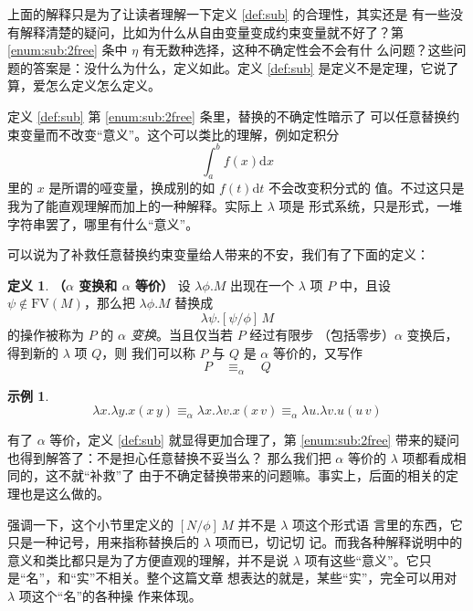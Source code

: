 \documentclass[a4paper,adobefonts]{ctexart}
\theoremstyle{definition}
\newtheorem{definition}{定义}
\newtheorem{example}{示例}
\begin{document}
上面的解释只是为了让读者理解一下定义 \ref{def:sub} 的合理性，其实还是
有一些没有解释清楚的疑问，比如为什么从自由变量变成约束变量就不好了？第
\ref{enum:sub:2free} 条中 $\eta$ 有无数种选择，这种不确定性会不会有什
么问题？这些问题的答案是：没什么为什么，定义如此。定义 \ref{def:sub}
是定义不是定理，它说了算，爱怎么定义怎么定义。

定义 \ref{def:sub} 第 \ref{enum:sub:2free} 条里，替换的不确定性暗示了
可以任意替换约束变量而不改变``意义''。这个可以类比的理解，例如定积分
$$
\int_a^bf(x)\text{d}x
$$里的 $x$ 是所谓的哑变量，换成别的如 $f(t)\text{d}t$ 不会改变积分式的
值。不过这只是我为了能直观理解而加上的一种解释。实际上 $\lambda$ 项是
形式系统，只是形式，一堆字符串罢了，哪里有什么``意义''。

可以说为了补救任意替换约束变量给人带来的不安，我们有了下面的定义：

\begin{definition}{\bfseries{（$\alpha$ 变换和 $\alpha$ 等价）}}
  设 $\lambda\phi.M$ 出现在一个 $\lambda$ 项 $P$ 中，且设
  $\psi\not\in\text{FV}(M)$，那么把 $\lambda\phi.M$ 替换成
$$
\lambda\psi.[\psi/\phi]\,M
$$的操作被称为 $P$ 的 \emph{$\alpha$ 变换}。当且仅当若 $P$ 经过有限步
           （包括零步）$\alpha$ 变换后，得到新的 $\lambda$ 项 $Q$，则
           我们可以称 $P$ 与 $Q$ 是 $\alpha$ 等价的，又写作
$$
P\quad\equiv_\alpha\quad Q
$$
\end{definition}

\begin{example}
$$
\lambda x.\lambda y.x(x\,y) \equiv_\alpha\lambda x.\lambda v.x(x\,v) \equiv_\alpha\lambda u.\lambda v.u(u\,v)
$$
\end{example}

有了 $\alpha$ 等价，定义 \ref{def:sub} 就显得更加合理了，第
\ref{enum:sub:2free} 带来的疑问也得到解答了：不是担心任意替换不妥当么？
那么我们把 $\alpha$ 等价的 $\lambda$ 项都看成相同的，这不就``补救''了
由于不确定替换带来的问题嘛。事实上，后面的相关的定理也是这么做的。

强调一下，这个小节里定义的 $[N/\phi]\,M$ 并不是 $\lambda$ 项这个形式语
言里的东西，它只是一种记号，用来指称替换后的 $\lambda$ 项而已，切记切
记。而我各种解释说明中的意义和类比都只是为了方便直观的理解，并不是说
$\lambda$ 项有这些``意义''。它只是``名''，和``实''不相关。整个这篇文章
想表达的就是，某些``实''，完全可以用对 $\lambda$ 项这个``名''的各种操
作来体现。

\newpage
\appendix
\end{document}
